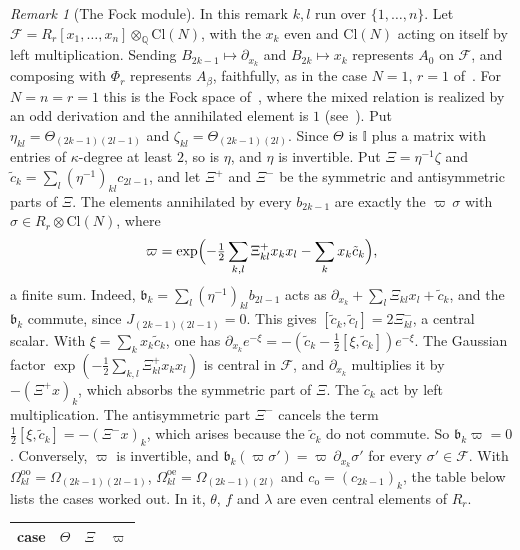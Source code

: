 \documentclass[11pt]{article}
\numberwithin{equation}{section}
\theoremstyle{definition}
\theoremstyle{remark}
\newtheorem{remark}[theorem]{Remark}
\begin{document}
\begin{remark}[The Fock module]\label{rem:fock}
In this remark $k,l$ run over $\{1,\ldots,n\}$.
Let $\mathcal F=R_r[x_1,\ldots,x_n]\otimes_{\mathbb Q}\mathrm{Cl}(N)$, with the $x_k$ even and $\mathrm{Cl}(N)$
acting on itself by left multiplication. Sending $B_{2k-1}\mapsto\partial_{x_k}$ and $B_{2k}\mapsto x_k$
represents $A_0$ on $\mathcal F$, and composing with $\Phi_r$ represents $A_\beta$, faithfully, as in the case $N=1$, $r=1$ of~\cite{Aoi26}. For $N=n=r=1$ this is the Fock space of~\cite[Section~4]{BS17}, where the mixed relation
is realized by an odd derivation and the annihilated element is $1$ (see~\cite{Aoi26}). Put
$\eta_{kl}=\Theta_{(2k-1)(2l-1)}$ and $\zeta_{kl}=\Theta_{(2k-1)(2l)}$. Since $\Theta$ is $\mathbb I$ plus a matrix with entries of
$\kappa$-degree at least $2$, so is $\eta$, and $\eta$ is invertible. Put $\Xi=\eta^{-1}\zeta$ and $\tilde c_k=\sum_l(\eta^{-1})_{kl}c_{2l-1}$, and let $\Xi^+$ and $\Xi^-$ be the
symmetric and antisymmetric parts of $\Xi$. The elements annihilated by every $b_{2k-1}$ are
exactly the $\varpi\,\sigma$ with $\sigma\in R_r\otimes\mathrm{Cl}(N)$, where
\[
 \varpi=\exp\Bigl(-\tfrac12\sum_{k,l}\Xi^+_{kl}x_kx_l-\sum_kx_k\tilde c_k\Bigr),
\]
a finite sum. Indeed, $\mathfrak b_k=\sum_l(\eta^{-1})_{kl}b_{2l-1}$ acts as
$\partial_{x_k}+\sum_l\Xi_{kl}x_l+\tilde c_k$, and the $\mathfrak b_k$ commute, since $J_{(2k-1)(2l-1)}=0$. This gives
$[\tilde c_k,\tilde c_l]=2\Xi^-_{kl}$, a central scalar. With $\xi=\sum_kx_k\tilde c_k$, one has
$\partial_{x_k}e^{-\xi}=-(\tilde c_k-\tfrac12[\xi,\tilde c_k])e^{-\xi}$. The Gaussian factor
$\exp(-\tfrac12\sum_{k,l}\Xi^+_{kl}x_kx_l)$ is central in $\mathcal F$, and $\partial_{x_k}$ multiplies it by $-(\Xi^+x)_k$, which absorbs the
symmetric part of $\Xi$. The $\tilde c_k$ act by left multiplication. The antisymmetric part $\Xi^-$ cancels
the term $\tfrac12[\xi,\tilde c_k]=-(\Xi^-x)_k$, which arises because the $\tilde c_k$ do not commute. So $\mathfrak b_k\varpi=0$. Conversely, $\varpi$ is invertible, and $\mathfrak b_k(\varpi\sigma')=\varpi\,\partial_{x_k}\sigma'$ for every
$\sigma'\in\mathcal F$. With $\Omega^{\mathrm{oo}}_{kl}=\Omega_{(2k-1)(2l-1)}$, $\Omega^{\mathrm{oe}}_{kl}=\Omega_{(2k-1)(2l)}$ and
$c_{\mathrm o}=(c_{2k-1})_k$, the table below lists the cases worked out. In it, $\theta$, $f$ and $\lambda$ are even central elements
of $R_r$.
\begin{center}\small
\begin{tabular}{llll}
case & $\Theta$ & $\Xi$ & $\varpi$\\\hline

\end{tabular}
\end{center}
\end{remark}
\end{document}
